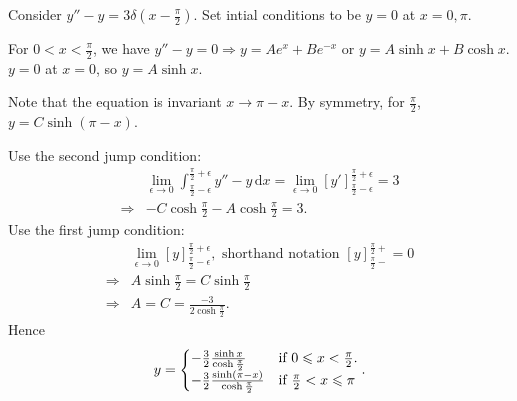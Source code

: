 \documentclass[a4paper]{article}
\begin{document}
      \begin{example}
          Consider $ y''-y=3\delta(x-\frac{\pi}{2}) $. Set intial conditions to be $ y=0 $ at $ x=0,\pi $.

          For $ 0<x< \frac{\pi}{2} $, we have $ y''-y=0 \Rightarrow y=Ae^x+Be^{-x} $ or $ y= A \sinh x+B \cosh x $. $ y=0 $ at $x=0$, so $ y=A \sinh x $.

          Note that the equation is invariant $ x\to \pi-x $. By symmetry, for $ \frac{\pi}{2} $, $ y=C \sinh (\pi-x) $.

          Use the second jump condition:
          \[
              \begin{aligned}
                &\lim_{\epsilon \to 0} \int_{\frac{\pi}{2}-\epsilon}^{\frac{\pi}{2}+\epsilon} y''-y \,\mathrm{d}x = \lim_{\epsilon \to 0} [y']_{\frac{\pi}{2}-\epsilon}^{\frac{\pi}{2}+\epsilon} = 3\\
                \Longrightarrow & -C \cosh \frac{\pi}{2}-A \cosh \frac{\pi}{2}=3.
              \end{aligned}
          \]
          Use the first jump condition:
          \[
              \begin{aligned}
                &\lim_{\epsilon \to 0} [y]_{\frac{\pi}{2}-\epsilon}^{\frac{\pi}{2}+\epsilon}, \text{ shorthand notation } [y]^{\frac{\pi}{2}+}_{\frac{\pi}{2}-}=0\\
                \Longrightarrow & A \sinh \frac{\pi}{2}=C \sinh \frac{\pi}{2}\\
                \Longrightarrow & A=C=\frac{-3}{2\cosh \frac{\pi}{2}}.
              \end{aligned}
          \]
          Hence 
          \[
              y= \begin{cases}
              -\frac{3}{2}\frac{\sinh x}{\cosh \frac{\pi}{2}} &\text{if $ 0\le x<\frac{\pi}{2} $.}\\
              -\frac{3}{2}\frac{\sinh (\pi -x)}{\cosh \frac{\pi}{2}}&\text{if $ \frac{\pi}{2}<x\le \pi $}\\
              \end{cases} 
          .\]
          \begin{center}
          \end{center}
      \end{example}
\end{document}
